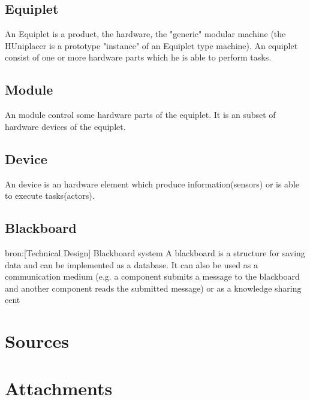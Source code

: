 \documentclass[12pt,a4paper]{report}
\begin{document}
\section{Equiplet}
An Equiplet is a product, the hardware, the "generic" modular machine (the HUniplacer is a prototype "instance" of an Equiplet type machine). An equiplet consist of one or more hardware parts which he is able to perform tasks.
\section{Module}
An module control some hardware parts of the equiplet. It is an subset of hardware devices of the equiplet.
\section{Device}
An device is an hardware element which produce information(sensors) or is able to execute tasks(actors).
\section{Blackboard}
bron:[Technical Design] Blackboard system
A blackboard is a structure for saving data and can be implemented as a database. It can also be used as a communication medium (e.g. a component submits a message to the blackboard and another component reads the submitted message) or as a knowledge sharing cent

\chapter{Sources}

\chapter{Attachments}



\end{document}
